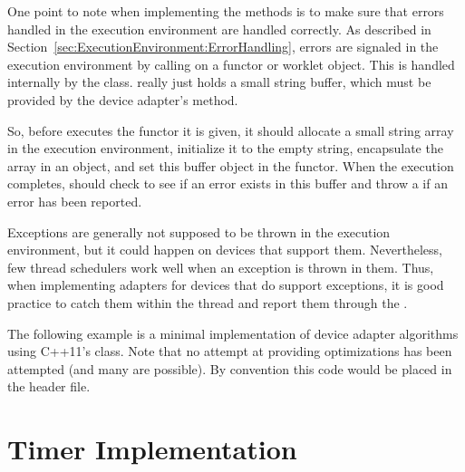 One point to note when implementing the  methods is to
make sure that errors handled in the execution environment are handled
correctly. As described in
Section~\ref{sec:ExecutionEnvironment:ErrorHandling}, errors are signaled
in the execution environment by calling  on a functor
or worklet object. This is handled internally by the
 class.
 really just holds a small string
buffer, which must be provided by the device adapter's 
method.

So, before  executes the functor it is given, it should
allocate a small string array in the execution environment, initialize it
to the empty string, encapsulate the array in an
 object, and set this buffer object in
the functor. When the execution completes,  should check
to see if an error exists in this buffer and throw a
 if an error has been reported.

\begin{commonerrors}
  Exceptions are generally not supposed to be thrown in the execution
  environment, but it could happen on devices that support them.
  Nevertheless, few thread schedulers work well when an exception is thrown
  in them. Thus, when implementing adapters for devices that do support
  exceptions, it is good practice to catch them within the thread and
  report them through the .
\end{commonerrors}

The following example is a minimal implementation of device adapter
algorithms using C++11's  class. Note that no attempt
at providing optimizations has been attempted (and many are possible). By
convention this code would be placed in the
header file.



\section{Timer Implementation}


